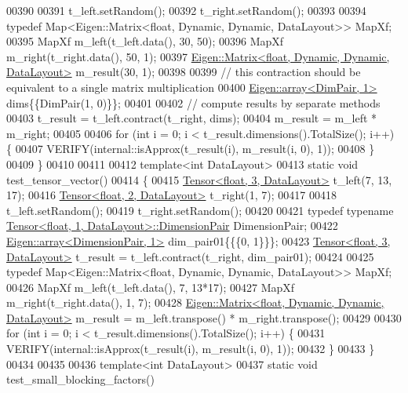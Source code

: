 \begin{DoxyCode}
00390 
00391   t\_left.setRandom();
00392   t\_right.setRandom();
00393 
00394   \textcolor{keyword}{typedef} Map<Eigen::Matrix<float, Dynamic, Dynamic, DataLayout>> MapXf;
00395   MapXf m\_left(t\_left.data(), 30, 50);
00396   MapXf m\_right(t\_right.data(), 50, 1);
00397   \hyperlink{group___core___module_class_eigen_1_1_matrix}{Eigen::Matrix<float, Dynamic, Dynamic, DataLayout>} 
      m\_result(30, 1);
00398 
00399   \textcolor{comment}{// this contraction should be equivalent to a single matrix multiplication}
00400   \hyperlink{class_eigen_1_1array}{Eigen::array<DimPair, 1>} dims\{\{DimPair(1, 0)\}\};
00401 
00402   \textcolor{comment}{// compute results by separate methods}
00403   t\_result = t\_left.contract(t\_right, dims);
00404   m\_result = m\_left * m\_right;
00405 
00406   \textcolor{keywordflow}{for} (\textcolor{keywordtype}{int} i = 0; i < t\_result.dimensions().TotalSize(); i++) \{
00407     VERIFY(internal::isApprox(t\_result(i), m\_result(i, 0), 1));
00408   \}
00409 \}
00410 
00411 
00412 \textcolor{keyword}{template}<\textcolor{keywordtype}{int} DataLayout>
00413 \textcolor{keyword}{static} \textcolor{keywordtype}{void} test\_tensor\_vector()
00414 \{
00415   \hyperlink{class_eigen_1_1_tensor}{Tensor<float, 3, DataLayout>} t\_left(7, 13, 17);
00416   \hyperlink{class_eigen_1_1_tensor}{Tensor<float, 2, DataLayout>} t\_right(1, 7);
00417 
00418   t\_left.setRandom();
00419   t\_right.setRandom();
00420 
00421   \textcolor{keyword}{typedef} \textcolor{keyword}{typename} \hyperlink{class_eigen_1_1_tensor}{Tensor<float, 1, DataLayout>::DimensionPair} 
      DimensionPair;
00422   \hyperlink{class_eigen_1_1array}{Eigen::array<DimensionPair, 1>} dim\_pair01\{\{\{0, 1\}\}\};
00423   \hyperlink{class_eigen_1_1_tensor}{Tensor<float, 3, DataLayout>} t\_result = t\_left.contract(t\_right, dim\_pair01);
00424 
00425   \textcolor{keyword}{typedef} Map<Eigen::Matrix<float, Dynamic, Dynamic, DataLayout>> MapXf;
00426   MapXf m\_left(t\_left.data(), 7, 13*17);
00427   MapXf m\_right(t\_right.data(), 1, 7);
00428   \hyperlink{group___core___module_class_eigen_1_1_matrix}{Eigen::Matrix<float, Dynamic, Dynamic, DataLayout>} 
      m\_result = m\_left.transpose() * m\_right.transpose();
00429 
00430   \textcolor{keywordflow}{for} (\textcolor{keywordtype}{int} i = 0; i < t\_result.dimensions().TotalSize(); i++) \{
00431     VERIFY(internal::isApprox(t\_result(i), m\_result(i, 0), 1));
00432   \}
00433 \}
00434 
00435 
00436 \textcolor{keyword}{template}<\textcolor{keywordtype}{int} DataLayout>
00437 \textcolor{keyword}{static} \textcolor{keywordtype}{void} test\_small\_blocking\_factors()

\end{DoxyCode}
